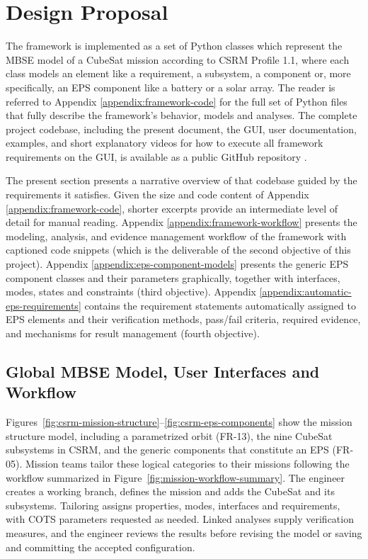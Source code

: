 \chapter{Design Proposal}
\label{ch:design-proposal}

The framework is implemented as a set of Python classes which represent the MBSE model of a CubeSat mission according to CSRM Profile 1.1, where each class models an element like a requirement, a subsystem, a component or, more specifically, an EPS component like a battery or a solar array.
The reader is referred to Appendix \ref{appendix:framework-code} for the full set of Python files that fully describe the framework's behavior, models and analyses.
The complete project codebase, including the present document, the GUI, user documentation, examples, and short explanatory videos for how to execute all framework requirements on the GUI, is available as a public GitHub repository \cite{repo}.

The present section presents a narrative overview of that codebase guided by the requirements it satisfies.
Given the size and code content of Appendix \ref{appendix:framework-code}, shorter excerpts provide an intermediate level of detail for manual reading.
Appendix \ref{appendix:framework-workflow} presents the modeling, analysis, and evidence management workflow of the framework with captioned code snippets (which is the deliverable of the second objective of this project).
Appendix \ref{appendix:eps-component-models} presents the generic EPS component classes and their parameters graphically, together with interfaces, modes, states and constraints (third objective).
Appendix \ref{appendix:automatic-eps-requirements} contains the requirement statements automatically assigned to EPS elements and their verification methods, pass/fail criteria, required evidence, and mechanisms for result management (fourth objective).

\section{Global MBSE Model, User Interfaces and Workflow}
Figures~\ref{fig:csrm-mission-structure}--\ref{fig:csrm-eps-components} show the mission structure model, including a parametrized orbit (FR-13), the nine CubeSat subsystems in CSRM, and the generic components that constitute an EPS (FR-05).
Mission teams tailor these logical categories to their missions following the workflow summarized in Figure~\ref{fig:mission-workflow-summary}.
The engineer creates a working branch, defines the mission and adds the CubeSat and its subsystems.
Tailoring assigns properties, modes, interfaces and requirements, with COTS parameters requested as needed.
Linked analyses supply verification measures, and the engineer reviews the results before revising the model or saving and committing the accepted configuration.

